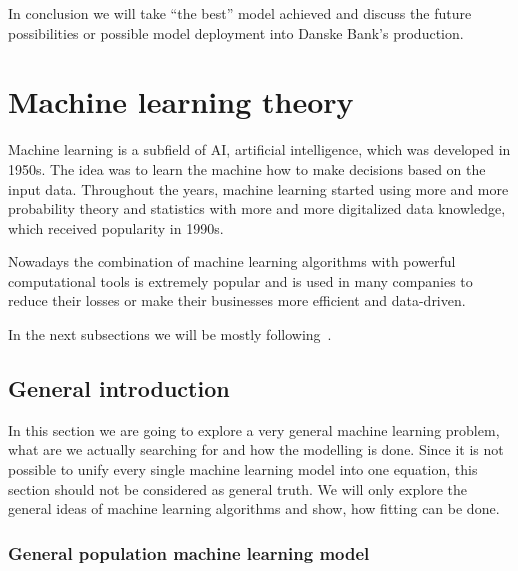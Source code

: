 \documentclass[12pt, a4paper]{report}
\theoremstyle{plain}
\theoremstyle{plain}
\theoremstyle{remark}
\begin{document}
In conclusion we will take ``the best'' model achieved and discuss the future possibilities or possible model deployment into Danske Bank's production.
\chapter{Machine learning theory}
\label{chap:machine_learning_theory}

Machine learning is a subfield of AI, artificial intelligence, which was developed in 1950s. The idea was to learn the machine how to make decisions based on the input data. Throughout the years, machine learning started using more and more probability theory and statistics with more and more digitalized data knowledge, which received popularity in 1990s.

Nowadays the combination of machine learning algorithms with powerful computational tools is extremely popular and is used in many companies to reduce their losses or make their businesses more efficient and data-driven.

In the next subsections we will be mostly following~\citep{basicRef}.

\section{General introduction}
\label{sec:mlt_general_introduction}

In this section we are going to explore a very general machine learning problem, what are we actually searching for and how the modelling is done. Since it is not possible to unify every single machine learning model into one equation, this section should not be considered as general truth. We will only explore the general ideas of machine learning algorithms and show, how fitting can be done.

\subsection{General population machine learning model}
\label{subsec:mlt_gi_general_population_machine_learning_model}
\end{document}
